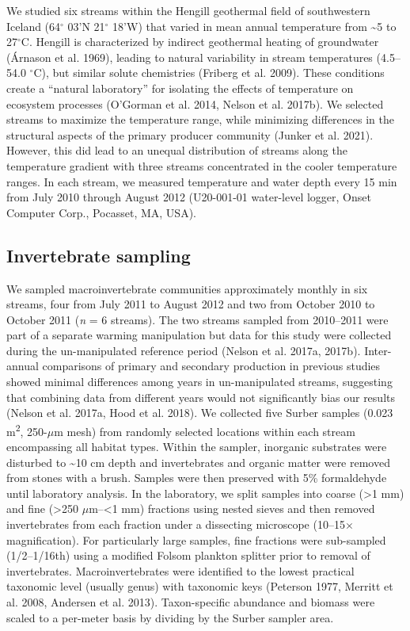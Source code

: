 \documentclass[
]{article}
\numberwithin{equation}
\begin{document}
We studied six streams within the Hengill geothermal field of
southwestern Iceland (64\(^\circ\) 03'N 21\(^\circ\) 18'W) that varied
in mean annual temperature from \textasciitilde5 to 27\(^\circ\)C.
Hengill is characterized by indirect geothermal heating of groundwater
(Árnason et al. 1969), leading to natural variability in stream
temperatures (4.5--54.0 \(^\circ\)C), but similar solute chemistries
(Friberg et al. 2009). These conditions create a ``natural laboratory''
for isolating the effects of temperature on ecosystem processes
(O'Gorman et al. 2014, Nelson et al. 2017b). We selected streams to
maximize the temperature range, while minimizing differences in the
structural aspects of the primary producer community (Junker et al.
2021). However, this did lead to an unequal distribution of streams
along the temperature gradient with three streams concentrated in the
cooler temperature ranges. In each stream, we measured temperature and
water depth every 15 min from July 2010 through August 2012 (U20-001-01
water-level logger, Onset Computer Corp., Pocasset, MA, USA).

\hypertarget{invertebrate-sampling}{%
\subsection{Invertebrate sampling}\label{invertebrate-sampling}}

We sampled macroinvertebrate communities approximately monthly in six
streams, four from July 2011 to August 2012 and two from October 2010 to
October 2011 (\emph{n} = 6 streams). The two streams sampled from
2010--2011 were part of a separate warming manipulation but data for
this study were collected during the un-manipulated reference period
(Nelson et al. 2017a, 2017b). Inter-annual comparisons of primary and
secondary production in previous studies showed minimal differences
among years in un-manipulated streams, suggesting that combining data
from different years would not significantly bias our results (Nelson et
al. 2017a, Hood et al. 2018). We collected five Surber samples (0.023
m\textsuperscript{2}, 250-\(\mu\)m mesh) from randomly selected
locations within each stream encompassing all habitat types. Within the
sampler, inorganic substrates were disturbed to \textasciitilde10 cm
depth and invertebrates and organic matter were removed from stones with
a brush. Samples were then preserved with 5\% formaldehyde until
laboratory analysis. In the laboratory, we split samples into coarse
(\textgreater1 mm) and fine (\textgreater250 \(\mu\)m--\textless1 mm)
fractions using nested sieves and then removed invertebrates from each
fraction under a dissecting microscope (10--15\(\times\) magnification).
For particularly large samples, fine fractions were sub-sampled
(1/2--1/16th) using a modified Folsom plankton splitter prior to removal
of invertebrates. Macroinvertebrates were identified to the lowest
practical taxonomic level (usually genus) with taxonomic keys (Peterson
1977, Merritt et al. 2008, Andersen et al. 2013). Taxon-specific
abundance and biomass were scaled to a per-meter basis by dividing by
the Surber sampler area.
\end{document}

